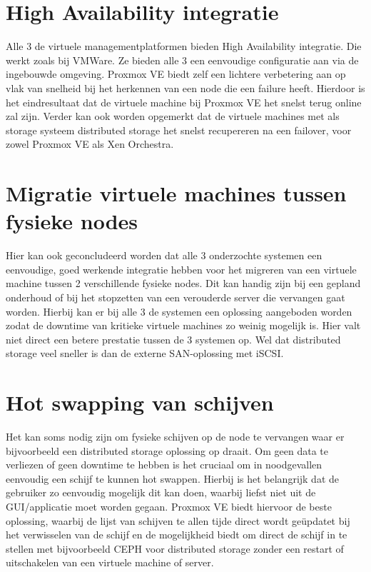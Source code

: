 \section{High Availability integratie}
Alle 3 de virtuele managementplatformen bieden High Availability integratie. Die werkt zoals bij VMWare. Ze bieden alle 3 een eenvoudige configuratie aan via de ingebouwde omgeving.
Proxmox VE biedt zelf een lichtere verbetering aan op vlak van snelheid bij het herkennen van een node die een failure heeft. Hierdoor is het eindresultaat dat de virtuele machine bij Proxmox VE het snelst terug online zal zijn.
Verder kan ook worden opgemerkt dat de virtuele machines met als storage systeem distributed storage het snelst recupereren na een failover, voor zowel Proxmox VE als Xen Orchestra.

\section{Migratie virtuele machines tussen fysieke nodes}
Hier kan ook geconcludeerd worden dat alle 3 onderzochte systemen een eenvoudige, goed werkende integratie hebben voor het migreren van een virtuele machine tussen 2 verschillende fysieke nodes.
Dit kan handig zijn bij een gepland onderhoud of bij het stopzetten van een verouderde server die vervangen gaat worden. Hierbij kan er bij alle 3 de systemen een oplossing aangeboden worden zodat de downtime van kritieke virtuele machines zo weinig mogelijk is.
Hier valt niet direct een betere prestatie tussen de 3 systemen op. Wel dat distributed storage veel sneller is dan de externe SAN-oplossing met iSCSI.

\section{Hot swapping van schijven}
Het kan soms nodig zijn om fysieke schijven op de node te vervangen waar er bijvoorbeeld een distributed storage oplossing op draait. Om geen data te verliezen of geen downtime te hebben is het cruciaal om in noodgevallen eenvoudig een schijf te kunnen hot swappen.
Hierbij is het belangrijk dat de gebruiker zo eenvoudig mogelijk dit kan doen, waarbij liefst niet uit de GUI/applicatie moet worden gegaan.
Proxmox VE biedt hiervoor de beste oplossing, waarbij de lijst van schijven te allen tijde direct wordt geüpdatet bij het verwisselen van de schijf en de mogelijkheid biedt om direct de schijf in te stellen met bijvoorbeeld CEPH voor distributed storage zonder een restart of uitschakelen van een virtuele machine of server.
\newpage

